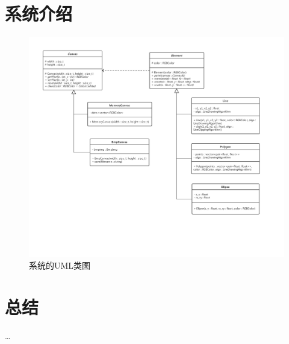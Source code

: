 \documentclass[a4paper,12pt]{article}
\begin{document}
\section{系统介绍}
\begin{figure}
\centering
\includegraphics[width=\linewidth]{uml.pdf}
\caption{系统的UML类图}
\end{figure}
\section{总结}
\dots

%

\end{document}
